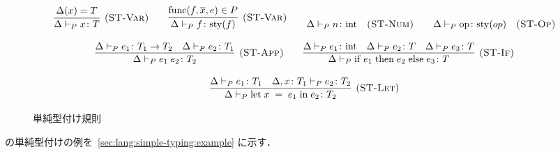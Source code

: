 \begin{figure}[h]
  \begin{align*}\begin{array}{c}
    \infer[\STRuleVar] {
      \StyJudge{P}{\Delta}{x}{T}
    } {
      \Delta\paren{x} = T
    }
    \quad\quad \infer[\STRuleVarFunc] {
      \StyJudge{P}{\Delta}{f}{\sty{f}}
    } {
      \Func{f}{\seq{x}}{e} \in P
    }
    \quad\quad \StyJudge{P}{\Delta}{n}{\StyInt} \quad\STRuleNum
    \quad\quad \StyJudge{P}{\Delta}{\mathrm{op}}{\sty{op}} \quad\STRuleOp \\\\
    \infer[\STRuleApp] {
      \StyJudge{P}{\Delta}{\App{e_1}{e_2}}{T_2}
    } {
      \StyJudge{P}{\Delta}{e_1}{\StyFunc{T_1}{T_2}}
      \quad \StyJudge{P}{\Delta}{e_2}{T_1}
    }
    \quad\quad \infer[\STRuleIf] {
      \StyJudge{P}{\Delta}{\If{e_1}{e_2}{e_3}}{T}
    } {
      \StyJudge{P}{\Delta}{e_1}{\StyInt}
      \quad \StyJudge{P}{\Delta}{e_2}{T}
      \quad \StyJudge{P}{\Delta}{e_3}{T}
    } \\\\
    \infer[\STRuleLet] {
      \StyJudge{P}{\Delta}{\Let{x}{e_1}{e_2}}{T_2}
    } {
      \StyJudge{P}{\Delta}{e_1}{T_1}
      \quad \StyJudge{P}{\Delta, \typed{x}{T_1}}{e_2}{T_2}
    }
  \end{array}\end{align*}
  \label{fig:lang:simple-type:rules}
  \caption{単純型付け規則}
\end{figure}

\par \Yil の単純型付けの例を~\ref{sec:lang:simple-typing:example} に示す．
